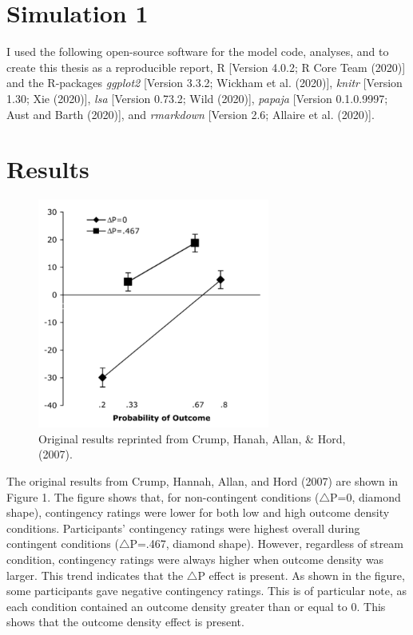\documentclass[
  english,
  man,floatsintext]{apa6}
\begin{document}
\hypertarget{simulation-1}{%
\section{Simulation 1}\label{simulation-1}}

I used the following open-source software for the model code, analyses, and to create this thesis as a reproducible report, R {[}Version 4.0.2; R Core Team (2020){]} and the R-packages \emph{ggplot2} {[}Version 3.3.2; Wickham et al. (2020){]}, \emph{knitr} {[}Version 1.30; Xie (2020){]}, \emph{lsa} {[}Version 0.73.2; Wild (2020){]}, \emph{papaja} {[}Version 0.1.0.9997; Aust and Barth (2020){]}, and \emph{rmarkdown} {[}Version 2.6; Allaire et al. (2020){]}.

\hypertarget{results}{%
\section{Results}\label{results}}

\begin{figure}

{\centering \includegraphics[width=3in]{imgs/crump_results} 

}

\caption{Original results reprinted from Crump, Hanah, Allan, \& Hord, (2007).}\label{fig:unnamed-chunk-4}
\end{figure}

The original results from Crump, Hannah, Allan, and Hord (2007) are shown in Figure 1. The figure shows that, for non-contingent conditions (\(\triangle\)P=0, diamond shape), contingency ratings were lower for both low and high outcome density conditions. Participants' contingency ratings were highest overall during contingent conditions (\(\triangle\)P=.467, diamond shape). However, regardless of stream condition, contingency ratings were always higher when outcome density was larger. This trend indicates that the \(\triangle\)P effect is present. As shown in the figure, some participants gave negative contingency ratings. This is of particular note, as each condition contained an outcome density greater than or equal to 0. This shows that the outcome density effect is present.
\end{document}

